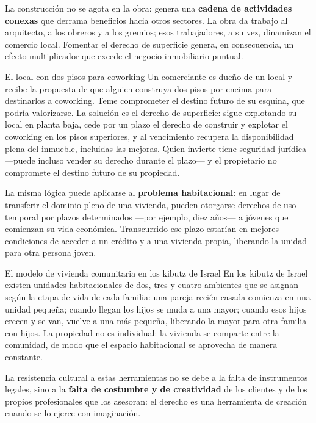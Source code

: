 \documentclass[12pt,oneside]{book}
\begin{document}
La construcción no se agota en la obra: genera una \textbf{cadena de actividades conexas} que derrama beneficios hacia otros sectores. La obra da trabajo al arquitecto, a los obreros y a los gremios; esos trabajadores, a su vez, dinamizan el comercio local. Fomentar el derecho de superficie genera, en consecuencia, un efecto multiplicador que excede el negocio inmobiliario puntual.

\begin{example}{El local con dos pisos para coworking}
Un comerciante es dueño de un local y recibe la propuesta de que alguien construya dos pisos por encima para destinarlos a coworking. Teme comprometer el destino futuro de su esquina, que podría valorizarse. La solución es el derecho de superficie: sigue explotando su local en planta baja, cede por un plazo el derecho de construir y explotar el coworking en los pisos superiores, y al vencimiento recupera la disponibilidad plena del inmueble, incluidas las mejoras. Quien invierte tiene seguridad jurídica ---puede incluso vender su derecho durante el plazo--- y el propietario no compromete el destino futuro de su propiedad.
\end{example}

La misma lógica puede aplicarse al \textbf{problema habitacional}: en lugar de transferir el dominio pleno de una vivienda, pueden otorgarse derechos de uso temporal por plazos determinados ---por ejemplo, diez años--- a jóvenes que comienzan su vida económica. Transcurrido ese plazo estarían en mejores condiciones de acceder a un crédito y a una vivienda propia, liberando la unidad para otra persona joven.

\begin{example}{El modelo de vivienda comunitaria en los kibutz de Israel}
En los kibutz de Israel existen unidades habitacionales de dos, tres y cuatro ambientes que se asignan según la etapa de vida de cada familia: una pareja recién casada comienza en una unidad pequeña; cuando llegan los hijos se muda a una mayor; cuando esos hijos crecen y se van, vuelve a una más pequeña, liberando la mayor para otra familia con hijos. La propiedad no es individual: la vivienda se comparte entre la comunidad, de modo que el espacio habitacional se aprovecha de manera constante.
\end{example}

La resistencia cultural a estas herramientas no se debe a la falta de instrumentos legales, sino a la \textbf{falta de costumbre y de creatividad} de los clientes y de los propios profesionales que los asesoran: el derecho es una herramienta de creación cuando se lo ejerce con imaginación.
\end{document}
